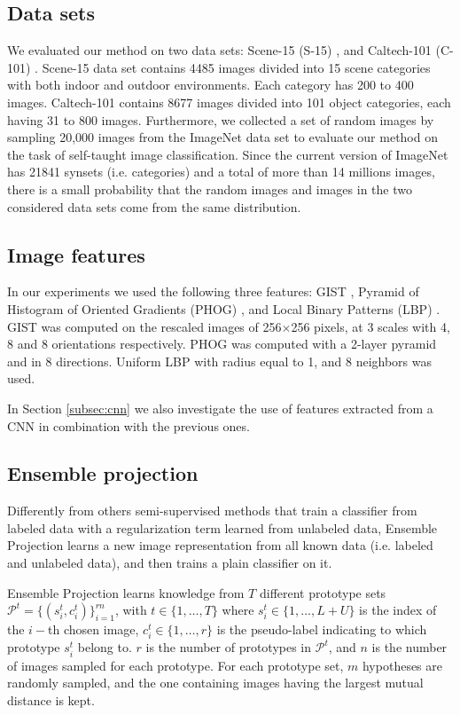 \documentclass[journal,11pt]{IEEEtran}
\begin{document}
\subsection{Data sets}
We evaluated our method on two data sets: Scene-15 (S-15) \cite{lazebnik2006beyond}, and Caltech-101 (C-101) \cite{fei2007learning}.
Scene-15 data set contains 4485 images divided into 15 scene categories with both indoor and outdoor environments. Each category has 200 to 400 images.
Caltech-101 contains 8677 images divided into 101 object categories, each having 31 to 800 images.
Furthermore, we collected a set of random images by sampling 20,000 images from the ImageNet data set \cite{deng2009imagenet} to evaluate our method on the task of self-taught image classification.
Since the current version of ImageNet has 21841 synsets (i.e. categories) and a total of more than 14 millions images, there is a small probability that the random images and images in the two considered data sets  come from the same distribution.

\subsection{Image features}
In our experiments we used the following three features: GIST \cite{oliva2001modeling}, Pyramid of Histogram of Oriented Gradients (PHOG) \cite{bosch2007image}, and Local Binary Patterns (LBP) \cite{ojala2002multiresolution}.
GIST was computed on the rescaled images of 256$\times$256 pixels, at 3 scales with 4, 8 and 8 orientations respectively.
PHOG was computed with a 2-layer pyramid and in 8 directions.
Uniform LBP with radius equal to 1, and 8 neighbors was used.

In Section \ref{subsec:cnn} we also investigate the use of features extracted from a CNN \cite{razavian2014cnn} in combination with the previous ones.

\subsection{Ensemble projection}
\label{sec:EP}
Differently from others semi-supervised methods that train a classifier
from labeled data with a regularization term learned from unlabeled data, Ensemble Projection \cite{dai2013ensemble} learns a new image representation from all known data (i.e. labeled and unlabeled data), and then trains a plain classifier
on it.

Ensemble Projection learns knowledge from $T$ different prototype sets $\mathcal{P}^t = \{ (s_i^t,c_i^t) \}_{i=1}^{rn}$, with $ t \in \{1, \ldots, T\}$ where $s_i^t \in \{1, \ldots, L+U \}$ is the index of the $i-$th chosen image, $c_i^t \in \{1, \ldots, r \}$ is the pseudo-label indicating to which prototype $s_i^t$ belong to. $r$ is the number of prototypes
in $\mathcal{P}^t$, and $n$ is the number of images sampled for each prototype.
For each prototype set, $m$ hypotheses are randomly sampled, and the one containing images having the largest mutual distance is kept.
\end{document}
